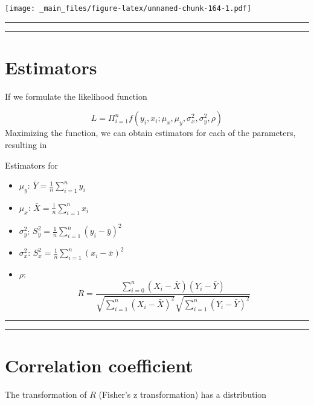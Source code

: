 \documentclass[
]{book}
\providecommand{\tightlist}{%
  \setlength{\itemsep}{0pt}\setlength{\parskip}{0pt}}
\begin{document}
\texttt{[image: \_main\_files/figure-latex/unnamed-chunk-164-1.pdf]}

\begin{center}\rule{0.5\linewidth}{0.5pt}\end{center}

\begin{center}\rule{0.5\linewidth}{0.5pt}\end{center}

\hypertarget{estimators}{%
\section{Estimators}\label{estimators}}

If we formulate the likelihood function

\[L=\Pi_{i=1}^n f(y_i,x_i; \mu_x, \mu_y, \sigma^2_x, \sigma_y^2, \rho)\]
Maximizing the function, we can obtain estimators for each of the parameters, resulting in

Estimators for

\begin{itemize}
\tightlist
\item
  \(\mu_y\): \(\bar{Y}=\frac{1}{n}\sum_{i=1}^n y_i\)
\item
  \(\mu_x\): \(\bar{X}=\frac{1}{n}\sum_{i=1}^n x_i\)
\item
  \(\sigma^2_y\): \(S^2_y=\frac{1}{n}\sum_{i=1}^n (y_i-\bar{y})^2\)
\item
  \(\sigma^2_x\): \(S^2_x=\frac{1}{n}\sum_{i=1}^n (x_i-\bar{x})^2\)
\item
  \(\rho\): \[R=\frac{\sum_{i=0}^n(X_i-\bar{X})(Y_i-\bar{Y})}{\sqrt{\sum_{i=1}^n(X_i-\bar{X})^2}\sqrt{\sum_{i=1}^n(Y_i-\bar{Y})^2}}\]
\end{itemize}

\begin{center}\rule{0.5\linewidth}{0.5pt}\end{center}

\begin{center}\rule{0.5\linewidth}{0.5pt}\end{center}

\hypertarget{correlation-coefficient}{%
\section{Correlation coefficient}\label{correlation-coefficient}}

The transformation of \(R\) (Fisher's z transformation) has a distribution
\end{document}
